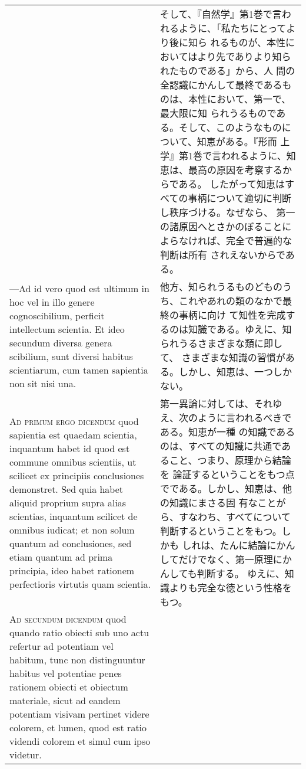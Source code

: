 \documentclass[10pt]{jsarticle}
\begin{document}
\begin{longtable}{p{21em}p{21em}}
&

そして、『自然学』第1巻で言われるように、「私たちにとってより後に知ら
れるものが、本性においてはより先でありより知られたものである」から、人
間の全認識にかんして最終であるものは、本性において、第一で、最大限に知
られうるものである。そして、このようなものについて、知恵がある。『形而
上学』第1巻で言われるように、知恵は、最高の原因を考察するからである。
したがって知恵はすべての事柄について適切に判断し秩序づける。なぜなら、
第一の諸原因へとさかのぼることによらなければ、完全で普遍的な判断は所有
されえないからである。

\\

---Ad id vero quod est ultimum in hoc vel in illo genere
cognoscibilium, perficit intellectum scientia. Et ideo secundum
diversa genera scibilium, sunt diversi habitus scientiarum, cum tamen
sapientia non sit nisi una.

&

他方、知られうるものどものうち、これやあれの類のなかで最終の事柄に向け
て知性を完成するのは知識である。ゆえに、知られうるさまざまな類に即して、
さまざまな知識の習慣がある。しかし、知恵は、一つしかない。

\\

{\scshape Ad primum ergo dicendum} quod sapientia est quaedam
scientia, inquantum habet id quod est commune omnibus scientiis, ut
scilicet ex principiis conclusiones demonstret. Sed quia habet aliquid
proprium supra alias scientias, inquantum scilicet de omnibus iudicat;
et non solum quantum ad conclusiones, sed etiam quantum ad prima
principia, ideo habet rationem perfectioris virtutis quam scientia.

&

第一異論に対しては、それゆえ、次のように言われるべきである。知恵が一種
の知識であるのは、すべての知識に共通であること、つまり、原理から結論を
論証するということをもつ点でである。しかし、知恵は、他の知識にまさる固
有なことがら、すなわち、すべてについて判断するということをもつ。しかも
しれは、たんに結論にかんしてだけでなく、第一原理にかんしても判断する。
ゆえに、知識よりも完全な徳という性格をもつ。

\\

{\scshape Ad secundum dicendum} quod quando ratio obiecti sub uno actu
refertur ad potentiam vel habitum, tunc non distinguuntur habitus vel
potentiae penes rationem obiecti et obiectum materiale, sicut ad
eandem potentiam visivam pertinet videre colorem, et lumen, quod est
ratio videndi colorem et simul cum ipso videtur.


\end{longtable}
\end{document}
